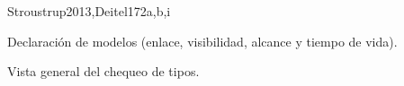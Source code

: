\begin{syllabus}
\begin{unit}{\PLBasicTypeSystems}{}{Stroustrup2013,Deitel17}{2}{a,b,i}
    \begin{topics}
        \item \PLBasicTypeSystemsTopicA
        \item Declaración de modelos (enlace, visibilidad, alcance y tiempo de vida).
        \item Vista general del chequeo de tipos.
    \end{topics}
    \begin{learningoutcomes}
        \item \PLBasicTypeSystemsLOForBoth [\Familiarity]
        \item \PLBasicTypeSystemsLOForA [\Familiarity]
        \item \PLBasicTypeSystemsLODescribeExamples [\Familiarity]
        \item \PLBasicTypeSystemsLOForMultiple [\Usage]
        \item \PLBasicTypeSystemsLOGiveAnThat [\Familiarity]
        \item \PLBasicTypeSystemsLOUseTypes [\Usage]
        \item \PLBasicTypeSystemsLOExplainHowDefine [\Familiarity]
        \item \PLBasicTypeSystemsLOWriteDown [\Usage]
        \item \PLBasicTypeSystemsLOExplainWhyType [\Familiarity]
        \item \PLBasicTypeSystemsLODefineAndPieces [\Usage]
        \item \PLBasicTypeSystemsLODiscussTheGenerics [\Familiarity]
        \item \PLBasicTypeSystemsLOExplainMultiple [\Familiarity]
    \end{learningoutcomes}
\end{unit}


\end{syllabus}
